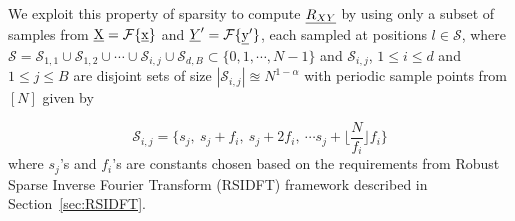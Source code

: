  We exploit this property of sparsity to compute $\underline{R_{XY}}$ by using only a subset of samples from $\underline{\mathrm{X}} = \mathcal{F}\{\underline{\mathrm{x}}\} $ and $\underline{Y}' = \mathcal{F}\{\underline{\mathrm{y}}'\} $, each sampled at positions $l \in \mathcal{S}$, where $\mathcal{S} = \mathcal{S}_{1,1} \cup \mathcal{S}_{1,2} \cup \cdots \cup \mathcal{S}_{i,j} \cup  \mathcal{S}_{d,B} \subset \{ 0,1,\cdots ,N-1 \}$ and $\mathcal{S}_{i,j}$, $1 \leq i \leq d $ and  $1 \leq j \leq B $ are disjoint sets of size $|\mathcal{S}_{i,j}| \approxeq N^{1-\alpha}$ with periodic sample points from $[N]$ given by 
 
 \begin{equation}
 \label{eqn:sampling_sets}\mathcal{S}_{i,j} = \{s_j,\ s_j + f_i,\ s_j + 2f_i,\ \cdots s_j + \lfloor{\frac{N}{f_i} }\rfloor f_i \}
 \end{equation}
   where $s_j$'s and $f_i$'s are constants chosen based on the requirements from Robust Sparse Inverse Fourier Transform (RSIDFT) framework described in Section~\ref{sec:RSIDFT}.


